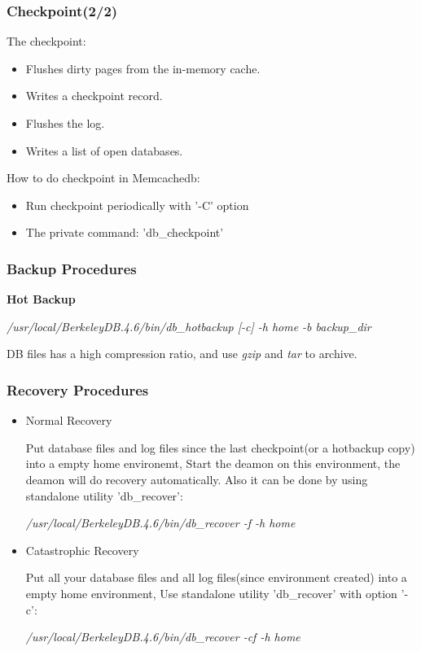 \documentclass{beamer}
\begin{document}
\begin{frame}
\frametitle{Checkpoint(2/2)}
The checkpoint:
\begin{itemize}
\item Flushes dirty pages from the in-memory cache.
\item Writes a checkpoint record.
\item Flushes the log.
\item Writes a list of open databases.
\end{itemize}
How to do checkpoint in Memcachedb:
\begin{itemize}
\item Run checkpoint periodically with '-C' option
\item The private command: 'db\_checkpoint'
\end{itemize}

\end{frame}

\begin{frame}
\frametitle{Backup Procedures}
\textbf{Hot Backup}
\begin{block}{}
\begin{semiverbatim}
 \textit{/usr/local/BerkeleyDB.4.6/bin/db\_hotbackup [-c] -h home -b backup\_dir}
\end{semiverbatim}
\end{block}
DB files has a high compression ratio, and use \textit{gzip} and \textit{tar} to archive.
\end{frame}

\begin{frame}
\frametitle{Recovery Procedures}
\begin{itemize}
\item Normal Recovery

Put database files and log files since the last checkpoint(or a hotbackup copy) into a empty home environemt,
Start the deamon on this environment, the deamon will do recovery automatically. Also it can be done by using 
standalone utility 'db\_recover':
\begin{block}{}
\begin{semiverbatim}
 \textit{/usr/local/BerkeleyDB.4.6/bin/db\_recover -f -h home}
\end{semiverbatim}
\end{block}

\item Catastrophic Recovery

Put all your database files and all log files(since environment created) into a empty home environment, Use standalone utility 'db\_recover' with option '-c':
\begin{block}{}
\begin{semiverbatim}
 \textit{/usr/local/BerkeleyDB.4.6/bin/db\_recover -cf -h home}
\end{semiverbatim}
\end{block}
\end{itemize}
\end{frame}
\end{document}
